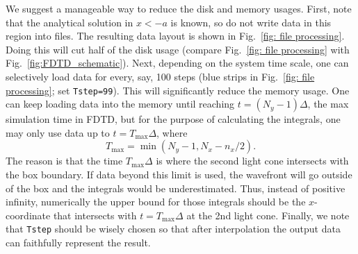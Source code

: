 \documentclass[12pt,letter,onecolumn,notitlepage]{article}
\begin{document}
\begin{appendices}
We suggest a manageable way to reduce the disk and memory usages. First, note that the analytical solution in $x<-a$ is known, so do not write data in this region into files. The resulting data layout is shown in Fig.~\ref{fig: file processing}. Doing this will cut half of the disk usage (compare Fig.~\ref{fig: file processing} with Fig.~\ref{fig:FDTD_schematic}). Next, depending on the system time scale, one can selectively load data for every, say, 100 steps (blue strips in Fig.~\ref{fig: file processing}; set \texttt{Tstep=99}). This will significantly reduce the memory usage. One can keep loading data into the memory until reaching $t=(N_y-1)\Delta$, the max simulation time in FDTD, but for the purpose of calculating the integrals, one may only use data up to $t=T_\text{max}\Delta$, where
\begin{equation}
T_\text{max}=\min(N_y-1, N_x-n_x/2).
\end{equation}
The reason is that the time $T_\text{max}\Delta$ is where the second light cone intersects with the box boundary. If data beyond this limit is used, the wavefront will go outside of the box and the integrals would be underestimated. Thus, instead of positive infinity, numerically the upper bound for those integrals should be the $x$-coordinate that intersects with $t=T_\text{max}\Delta$ at the 2nd light cone.
Finally, we note that \texttt{Tstep} should be wisely chosen so that after interpolation the output data can faithfully represent the result.
\end{appendices}


\end{document}
